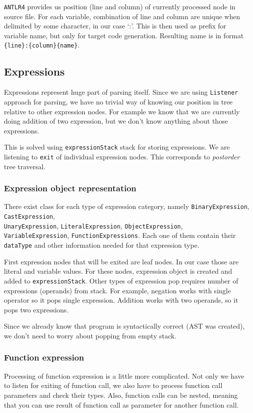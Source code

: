 \documentclass[a4paper, 11pt]{article}
\begin{document}
\texttt{ANTLR4} provides us position (line and column) of currently processed node in source file. For each variable, combination of line and column are unique when delimited by some character, in our case `:'. This is then used as prefix for variable name, but only for target code generation. Resulting name is in format \texttt{\{line\}:\{column\}\{name\}}.

\subsection{Expressions}
Expressions represent huge part of parsing itself. Since we are using \texttt{Listener} approach for parsing, we have no trivial way of knowing our position in tree relative to other expression nodes. For example we know that we are currently doing addition of two expression, but we don't know anything about those expressions.

This is solved using \texttt{expressionStack} stack for storing expressions. We are listening to \texttt{exit} of individual expression nodes. This corresponds to \textit{postorder} tree traversal.

\subsubsection*{Expression object representation}
There exist class for each type of expression category, namely \texttt{BinaryExpression}, \texttt{CastExpression}, \\\texttt{UnaryExpression}, \texttt{LiteralExpression}, \texttt{ObjectExpression}, \\\texttt{VariableExpression}, \texttt{FunctionExpressions}. Each one of them contain their \texttt{dataType} and other information needed for that expression type. 


First expression nodes that will be exited are leaf nodes. In our case those are literal and variable values. For these nodes, expression object is created and added to \texttt{expressionStack}. Other types of expression pop requires number of expressions (operands) from stack. For example, negation works with single operator so it pops single expression. Addition works with two operands, so it pops two expressions.

Since we already know that program is syntactically correct (AST was created), we don't need to worry about popping from empty stack.

\subsubsection*{Function expression}
Processing of function expression is a little more complicated. Not only we have to listen for exiting of function call, we also have to process function call parameters and check their types. Also, function calls can be nested, meaning that you can use result of function call as parameter for another function call.
\end{document}
